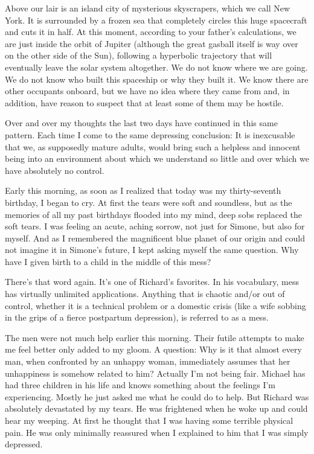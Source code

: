 \documentclass[]{article}
\begin{document}
Above our lair is an island city of mysterious skyscrapers, which we call New York.  It is surrounded by a frozen sea that completely circles this huge spacecraft and cuts it in half.  At this moment, according to your father’s calculations, we are just inside the orbit of Jupiter (although the great gasball itself is way over on the other side of the Sun), following a hyperbolic trajectory that will eventually leave the solar system altogether.  We do not know where we are going.  We do not know who built this spaceship or why they built it.  We know there are other occupants onboard, but we have no idea where they came from and, in addition, have reason to suspect that at least some of them may be hostile.

Over and over my thoughts the last two days have continued in this same pattern.  Each time I come to the same depressing conclusion: It is inexcusable that we, as supposedly mature adults, would bring such a helpless and innocent being into an environment about which we understand so little and over which we have absolutely no control.

Early this morning, as soon as I realized that today was my thirty-seventh birthday, I began to cry.  At first the tears were soft and soundless, but as the memories of all my past birthdays flooded into my mind, deep sobs replaced the soft tears.  I was feeling an acute, aching sorrow, not just for Simone, but also for myself.  And as I remembered the magnificent blue planet of our origin and could not imagine it in Simone’s future, I kept asking myself the same question.  Why have I given birth to a child in the middle of this mess?

There’s that word again.  It’s one of Richard’s favorites.  In his vocabulary, mess has virtually unlimited applications.  Anything that is chaotic and/or out of control, whether it is a technical problem or a domestic crisis (like a wife sobbing in the grips of a fierce postpartum depression), is referred to as a mess.

The men were not much help earlier this morning.  Their futile attempts to make me feel better only added to my gloom.  A question: Why is it that almost every man, when confronted by an unhappy woman, immediately assumes that her unhappiness is somehow related to him? Actually I’m not being fair.  Michael has had three children in his life and knows something about the feelings I’m experiencing.  Mostly he just asked me what he could do to help.  But Richard was absolutely devastated by my tears.  He was frightened when he woke up and could hear my weeping.  At first he thought that I was having some terrible physical pain.  He was only minimally reassured when I explained to him that I was simply depressed.
\end{document}
